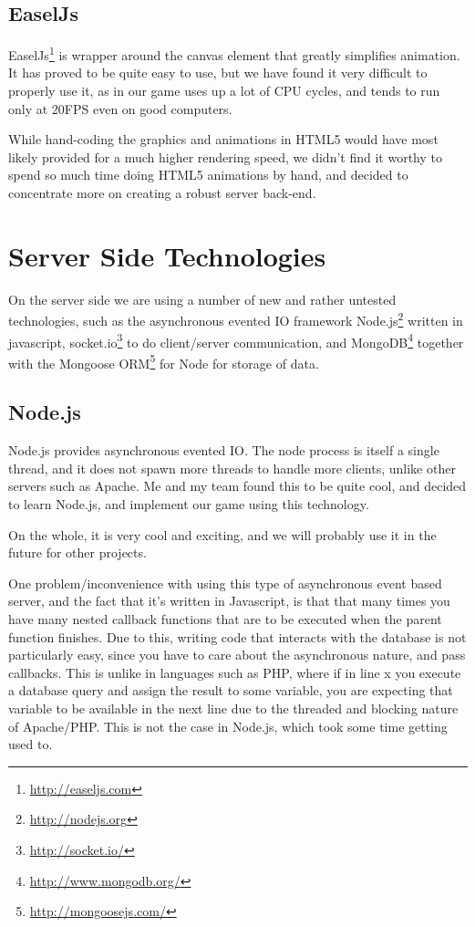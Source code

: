 \documentclass[a4paper,11pt]{article}
\begin{document}
		\subsection{EaselJs}
			EaselJs\footnote{\url{http://easeljs.com}} is wrapper around the canvas element that greatly simplifies animation. It has proved to be quite easy to use, but we have found it very difficult to properly use it, as in our game uses up a lot of CPU cycles, and tends to run only at 20FPS even on good computers. 
			
			While hand-coding the graphics and animations in HTML5 would have most likely provided for a much higher rendering speed, we didn't find it worthy to spend so much time doing HTML5 animations by hand, and decided to concentrate more on creating a robust server back-end.
					
	\section{Server Side Technologies}
		On the server side we are using a number of new and rather untested technologies, such as the asynchronous evented IO framework Node.js\footnote{\url{http://nodejs.org}} written in javascript, socket.io\footnote{\url{http://socket.io/}} to do client/server communication, and MongoDB\footnote{\url{http://www.mongodb.org/}} together with the Mongoose ORM\footnote{\url{http://mongoosejs.com/}}  for Node for storage of data.
	
		\subsection{Node.js}
		
			Node.js provides asynchronous evented IO. The node process is itself a single thread, and it does not spawn more threads to handle more clients, unlike other servers such as Apache. Me and my team found this to be quite cool, and decided to learn Node.js, and implement our game using this technology.
			
			On the whole, it is very cool and exciting, and we will probably use it in the future for other projects.
			
			One problem/inconvenience with using this type of asynchronous event based server, and the fact that it's written in Javascript, is that that many times you have many nested callback functions that are to be executed when the parent function finishes. Due to this, writing code that interacts with the database is not particularly easy, since you have to care about the asynchronous nature, and pass callbacks. This is unlike in languages such as PHP, where if in line x you execute a database query and assign the result to some variable, you are expecting that variable to be available in the next line due to the threaded and blocking nature of Apache/PHP. This is not the case in Node.js, which took some time getting used to.
			
\end{document}
